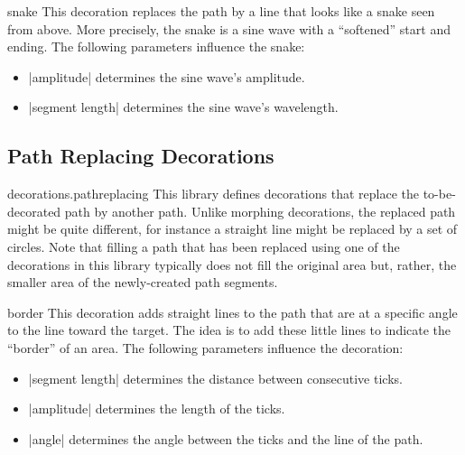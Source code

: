 \begin{decoration}{snake}
    This decoration replaces the path by a line that looks like a snake seen
    from above. More precisely, the snake is a sine wave with a ``softened''
    start and ending. The following parameters influence the snake:
    \begin{itemize}
        \item |amplitude| determines the sine wave's amplitude.
        \item |segment length| determines the sine wave's wavelength.
    \end{itemize}
\begin{codeexample}[]
\end{codeexample}
\end{decoration}


\subsection{Path Replacing Decorations}

\begin{pgflibrary}{decorations.pathreplacing}
    This library defines decorations that replace the to-be-decorated path by
    another path. Unlike morphing decorations, the replaced path might be quite
    different, for instance a straight line might be replaced by a set of
    circles. Note that filling a path that has been replaced using one of the
    decorations in this library typically does not fill the original area but,
    rather, the smaller area of the newly-created path segments.
\end{pgflibrary}

\begin{decoration}{border}
    This decoration adds straight lines to the path that are at a specific
    angle to the line toward the target. The idea is to add these little lines
    to indicate the ``border'' of an area. The following parameters influence
    the decoration:
    \begin{itemize}
        \item |segment length| determines the distance between consecutive
            ticks.
        \item |amplitude| determines the length of the ticks.
        \item |angle| determines the angle between the ticks and the line of
            the path.
    \end{itemize}
\begin{codeexample}[]
\end{codeexample}
\end{decoration}

